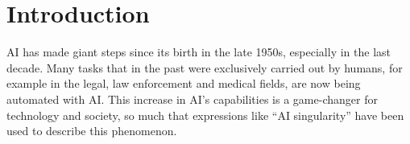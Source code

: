 \documentclass[conference]{IEEEtran}
\newcommand{\cit}[1][]{\todo[tickmarkheight=0.2cm]{cit #1}}
\begin{document}
\begin{abstract}
\end{abstract}





\section{Introduction}
\label{sec:intro}


AI has made giant steps since its birth in the late 1950s, especially in the last
decade. Many tasks that in the past were exclusively carried out by humans, for
example in the legal, law enforcement and medical fields, are now being
automated with AI.  \cit This increase in AI's capabilities is a game-changer for
technology and society, so much that expressions like ``AI singularity'' \cit
have been used to describe this
phenomenon.
\end{document}
